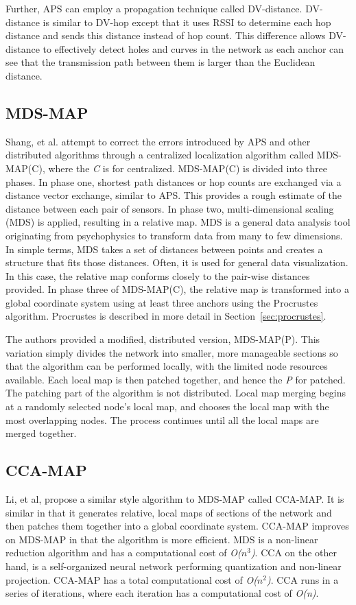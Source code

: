 Further, APS can employ a propagation technique called DV-distance.  DV-distance is similar to DV-hop except that it uses RSSI to determine each hop distance and sends this distance instead of hop count.  This difference allows DV-distance to effectively detect holes and curves in the network as each anchor can see that the transmission path between them is larger than the Euclidean distance.

\subsection{MDS-MAP}
Shang, et al. attempt to correct the errors introduced by APS and other distributed algorithms through a centralized localization algorithm called MDS-MAP(C)\cite{MDS-MAP}, where the \emph{C} is for centralized.  MDS-MAP(C) is divided into three phases.  In phase one, shortest path distances or hop counts are exchanged via a distance vector exchange, similar to APS.  This provides a rough estimate of the distance between each pair of sensors.  In phase two, multi-dimensional scaling (MDS) is applied, resulting in a relative map.  MDS is a general data analysis tool originating from psychophysics to transform data from many to few dimensions.  In simple terms, MDS takes a set of distances between points and creates a structure that fits those distances.  Often, it is used for general data visualization.  In this case, the relative map conforms closely to the pair-wise distances provided.  In phase three of MDS-MAP(C), the relative map is transformed into a global coordinate system using at least three anchors using the Procrustes algorithm.  Procrustes is described in more detail in Section~\ref{sec:procrustes}.

The authors provided a modified, distributed version, MDS-MAP(P)\cite{MDS-MAP-P}.  This variation simply divides the network into smaller, more manageable sections so that the algorithm can be performed locally, with the limited node resources available.  Each local map is then patched together, and hence the \emph{P} for patched.  The patching part of the algorithm is not distributed.  Local map merging begins at a randomly selected node's local map, and chooses the local map with the most overlapping nodes.  The process continues until all the local maps are merged together.  

\subsection{CCA-MAP} \label{sec:CCA-MAP}
Li, et al, propose a similar style algorithm to MDS-MAP called CCA-MAP\cite{CCA-MAP07,CCA-MAP09}.  It is similar in that it generates relative, local maps of sections of the network and then patches them together into a global coordinate system.  CCA-MAP improves on MDS-MAP in that the algorithm is more efficient.  MDS is a non-linear reduction algorithm and has a computational cost of \emph{O($n^{3}$)}.  CCA\cite{CCA} on the other hand, is a self-organized neural network performing quantization and non-linear projection.  CCA-MAP has a total computational cost of \emph{O($n^{2}$)}.  CCA runs in a series of iterations, where each iteration has a computational cost of \emph{O(n)}.

